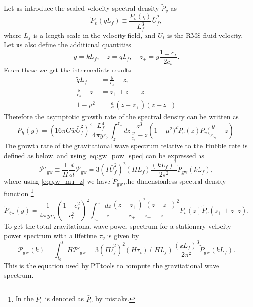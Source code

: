 Let us introduce the scaled velocity spectral density $\tilde{P}_v$ as
\begin{equation}
\tilde{P}_v(qL_f) \equiv \frac{P_v(q)}{L_f^3} \bar{U}_f^2,
\label{eq:tilde_p_v}
\end{equation}
where $L_f$ is a length scale in the velocity field, and $\bar{U}_f$ is the RMS fluid velocity.
Let us also define the additional quantities
\begin{equation}
y = kL_f, \quad z = qL_f, \quad z_\pm = y \frac{1 \pm c_s}{2 c_s}.
\label{eq:gw_yz}
\end{equation}
From these we get the intermediate results
\begin{align}
\tilde{q}L_f &= \frac{y}{c_s} - z, \\
\frac{y}{c_s} - z &= z_+ + z_- - z, \\
1 - \mu^2 &= \frac{a}{z^2}(z-z_+)(z-z_-)
\label{eq:gw_mu_z}
\end{align}
Therefore the asymptotic growth rate of the spectral density can be written as
\begin{equation}
\dot{P}_{\dot{h}}(y) =
\left( 16 \pi G \bar{w} \bar{U}_f^2 \right)^2
\frac{L_f^4}{4 \pi y c_s}
\int_{z_-}^{z_+} dz
\frac{z^3}{\frac{y}{c_s} - z}
\left(1 - \mu^2)^2
\tilde{P}_v (z) \tilde{P}_v (\frac{y}{c_s} - z \right).
\end{equation}
The growth rate of the gravitational wave spectrum relative to the Hubble rate is defined as below,
and using \eqref{eq:gw_pow_spec} can be expressed as
\cite[eq. 3.46]{hindmarsh_gw_pt_2019}
\begin{equation}
\mathcal{P}'_{\text{gw}} \equiv \frac{1}{H} \frac{d}{dt} \mathcal{P}_{\text{gw}}
= 3 \left( \Gamma \bar{U}_f^2 \right)^2 (HL_f) \frac{(kL_f)^3}{2 \pi^2} \tilde{P}_{\text{gw}} (kL_f),
\label{eq:pow_gw_prime}
\end{equation}
where using \eqref{eq:gw_mu_z} we have $\tilde{P}_{\text{gw}}$,the dimensionless spectral density function
\cite[eq. 3.47]{hindmarsh_gw_pt_2019}
\footnote{In \cite{hindmarsh_gw_pt_2019} the $\tilde{P}_v$ is denoted as $\bar{P}_v$ by mistake.}
\begin{equation}
\tilde{P}_\text{gw} (y) = \frac{1}{4\pi yc_s} \left(\frac{1-c_s^2}{c_s^2}\right)^2
\int_{z_-}^{z_+} \frac{dz}{z}
\frac{(z-z_+)^2(z-z_-)^2}{z_+ + z_- - z}
\tilde{P}_v (z) \tilde{P}_v (z_+ + z_- z).
\label{eq:spectral_density}
\end{equation}
To get the total gravitational wave power spectrum for a stationary velocity power spectrum with a lifetime $\tau_v$ is given by
\begin{equation}
\mathcal{P}_\text{gw}(k)
= \int_{t_0}^{t} H \mathcal{P}'_\text{gw}
= 3 \left( \Gamma \bar{U}_f^2 \right)^2 (H \tau_v)(H L_f) \frac{(kL_f)^3}{2\pi^2} \tilde{P}_\text{gw} (kL_f).
\label{eq:pow_gw}
\end{equation}
This is the equation used by PTtools to compute the gravitational wave spectrum.

